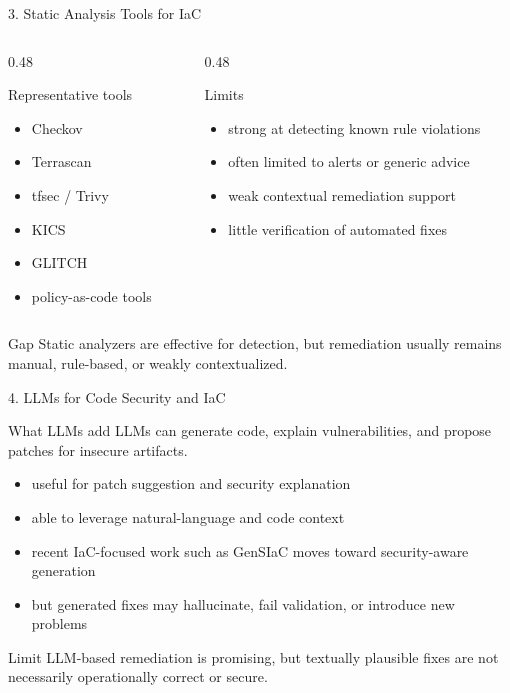 \documentclass[aspectratio=169,10pt]{beamer}
\begin{document}
\begin{frame}{3. Static Analysis Tools for IaC}
\begin{columns}[T]
\begin{column}{0.48\textwidth}
\begin{block}{Representative tools}
\small
\begin{itemize}
  \item Checkov
  \item Terrascan
  \item tfsec / Trivy
  \item KICS
  \item GLITCH
  \item policy-as-code tools
\end{itemize}
\end{block}
\end{column}
\begin{column}{0.48\textwidth}
\begin{block}{Limits}
\small
\begin{itemize}
  \item strong at detecting known rule violations
  \item often limited to alerts or generic advice
  \item weak contextual remediation support
  \item little verification of automated fixes
\end{itemize}
\end{block}
\end{column}
\end{columns}
\vspace{0.35cm}
\begin{alertblock}{Gap}
Static analyzers are effective for detection, but remediation usually remains manual, rule-based, or weakly contextualized.
\end{alertblock}
\end{frame}

\begin{frame}{4. LLMs for Code Security and IaC}
\begin{block}{What LLMs add}
\small
LLMs can generate code, explain vulnerabilities, and propose patches for insecure artifacts.
\end{block}
\begin{itemize}
  \item useful for patch suggestion and security explanation
  \item able to leverage natural-language and code context
  \item recent IaC-focused work such as GenSIaC moves toward security-aware generation
  \item but generated fixes may hallucinate, fail validation, or introduce new problems
\end{itemize}
\vspace{0.35cm}
\begin{alertblock}{Limit}
LLM-based remediation is promising, but textually plausible fixes are not necessarily operationally correct or secure.
\end{alertblock}
\end{frame}
\end{document}
